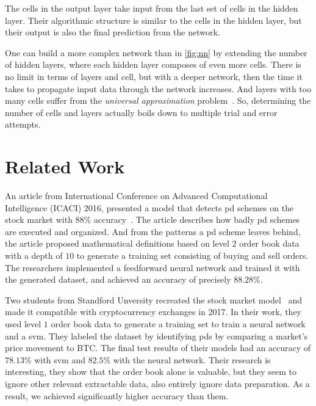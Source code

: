 The cells in the output layer take input from the last set of cells in the hidden layer. Their algorithmic structure is similar to the cells in the hidden layer, but their output is also the final prediction from the network.

One can build a more complex network than in \autoref{fig:nn} by extending the number of hidden layers, where each hidden layer composes of even more cells. There is no limit in terms of layers and cell, but with a deeper network, then the time it takes to propagate input data through the network increases. And layers with too many cells suffer from the \emph{universal approximation} problem~\cite{hornik1989multilayer, hornik1993some}. So, determining the number of cells and layers actually boils down to multiple trial and error attempts.

\section{Related Work}\label{sec:related_work}
An article from International Conference on Advanced Computational Intelligence (ICACI) 2016, presented a model that detects \ac{pd} schemes on the stock market with $88\%$ accuracy~\cite{P&D_stock_price_manipulation}. The article describes how badly \ac{pd} schemes are executed and organized. And from the patterns a \ac{pd} scheme leaves behind, the article proposed mathematical definitions based on level $2$ order book data with a depth of $10$ to generate a training set consisting of buying and sell orders. The researchers implemented a feedforward neural network and trained it with the generated dataset, and achieved an accuracy of precisely $88.28\%$.

Two students from Standford Unversity recreated the stock market model~\cite{P&D_stock_price_manipulation} and made it compatible with cryptocurrency exchanges in 2017. In their work, they used level $1$ order book data to generate a training set to train a neural network and a \ac{svm}. They labeled the dataset by identifying \acp{pd} by comparing a market's price movement to BTC. The final test results of their models had an accuracy of $78.13\%$ with \ac{svm} and $82.5$\% with the neural network. Their research is interesting, they show that the order book alone is valuable, but they seem to ignore other relevant extractable data, also entirely ignore data preparation. As a result, we achieved significantly higher accuracy than them.

